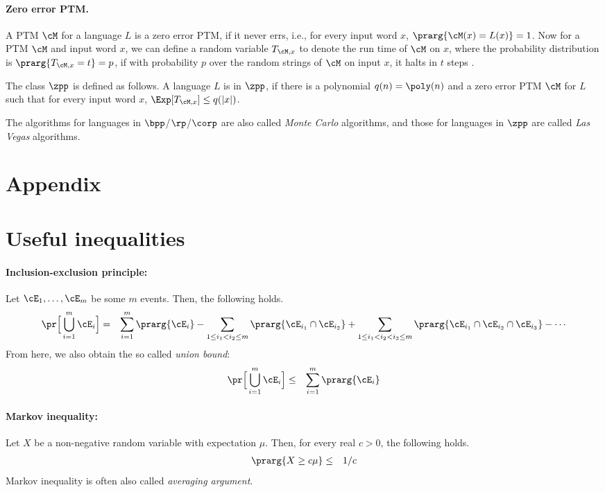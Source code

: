 \documentclass[11pt, a4paper]{article}
\begin{document}
\paragraph*{Zero error PTM.}
A PTM $\cM$ for a language $L$ is a zero error PTM, if it never errs, 
i.e., for every input word $x$, $\prarg {\cM(x)=L(x)}=1$.
Now for a PTM $\cM$ and input word $x$,
we can define a  random variable $T_{\cM,x}$ to denote the run time of $\cM$ on $x$,
where the probability distribution is $\prarg {T_{\cM,x}=t} = p$,
if with probability $p$ over the random strings of $\cM$ on input $x$, it halts in $t$ steps .

The class $\zpp$ is defined as follows.
A language $L$ is in $\zpp$, if there is a polynomial $q(n)=\poly(n)$
and a zero error PTM $\cM$ for $L$ such that for every input word $x$,
$\Exp [T_{\cM,x}] \leq q(|x|)$.

The algorithms for languages in $\bpp$/$\rp$/$\corp$ are also called {\em Monte Carlo} algorithms,
and those for languages in $\zpp$ are called {\em Las Vegas} algorithms.


\appendix

\section*{Appendix}


\section{Useful inequalities}
\label{app:inequalities}

\paragraph*{Inclusion-exclusion principle:}
Let $\cE_1,\ldots,\cE_m$ be some $m$ events.
Then, the following holds.
\begin{eqnarray*}
\pr \Big[ \bigcup_{i=1}^m \cE_i \Big] & = & 
\sum_{i=1}^{m} \prarg {\cE_i} - 
\sum_{1\leq i_1 < i_2 \leq m} \prarg {\cE_{i_1}\cap \cE_{i_2}} +
\sum_{1\leq i_1 < i_2 < i_3 \leq m} \prarg {\cE_{i_1}\cap \cE_{i_2}\cap \cE_{i_3}} - 
\cdots
\end{eqnarray*}
From here, we also obtain the so called {\em union bound}:
\begin{eqnarray*}
\pr \Big[ \bigcup_{i=1}^m \cE_i \Big] & \leq & \sum_{i=1}^{m} \prarg {\cE_i} 
\end{eqnarray*}


\paragraph*{Markov inequality:}
Let $X$ be a non-negative random variable with expectation $\mu$.
Then, for every real $c>0$, the following holds.
\begin{eqnarray*}
\prarg {X \geq c\mu} & \leq & 1/c
\end{eqnarray*}
Markov inequality is often also called {\em averaging argument}.
\end{document}
